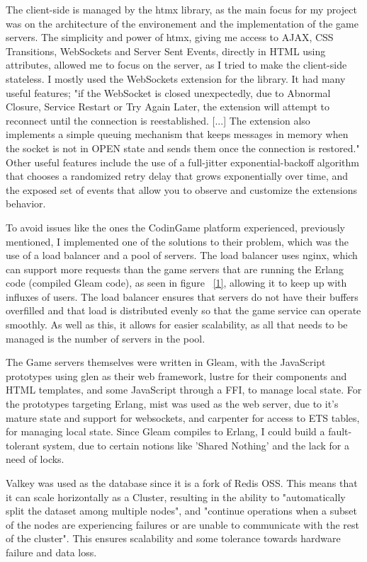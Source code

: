 \documentclass[]{project_interim}
\begin{document}
The client-side is managed by the htmx library, as the main focus for my project
was on the architecture of the environement and the implementation of the game
servers. The simplicity and power of htmx, giving me access to AJAX, CSS Transitions,
WebSockets and Server Sent Events, directly in HTML using attributes,\cite{noauthor_htmx_nodate} allowed me to
focus on the server, as I tried to make the client-side stateless. I mostly
used the WebSockets extension for the library. It had many useful features;
"if the WebSocket is closed unexpectedly, due to Abnormal Closure, Service Restart
or Try Again Later, the extension will attempt to reconnect until the connection
is reestablished. [...] The extension also implements a simple queuing mechanism that
keeps messages in memory when the socket is not in OPEN state and sends
them once the connection is restored."\cite{noauthor_htmx_ws_nodate} Other useful features include the
use of a full-jitter exponential-backoff algorithm that chooses a randomized
retry delay that grows exponentially over time, and the exposed
set of events that allow you to observe and customize the extensions behavior.
\cite{noauthor_htmx_ws_nodate}

To avoid issues like the ones the CodinGame platform
experienced, previously mentioned, I implemented one of the
solutions to their problem, which was the use of a load balancer and a pool
of servers\cite{jobert_story_2017}. The load balancer uses nginx, which can
support more requests
than the game servers that are running the Erlang code (compiled Gleam code),
as seen in figure ~\ref{1}, allowing it to keep up with influxes of users.
The load balancer ensures that servers do not have their buffers overfilled
and that load is distributed evenly so that the game service can operate smoothly.
As well as this, it allows for easier scalability, as all that needs to be managed is the
number of servers in the pool.

The Game servers themselves were written in Gleam, with the JavaScript prototypes
using glen as their web framework, lustre for their components and HTML templates,
and some JavaScript through a FFI, to manage local state. For the prototypes
targeting Erlang, mist was used as the web server, due to it's mature state
and support for websockets, and carpenter for access to ETS tables, for managing
local state. Since Gleam compiles to Erlang, I could build a fault-tolerant
system, due to certain notions like 'Shared Nothing' and the lack for a need
of locks.

Valkey was used as the database since it is a fork of Redis OSS.
This means that it can scale horizontally as a Cluster, resulting in
the ability to "automatically split the dataset among multiple nodes", and
"continue operations when a subset of the nodes are experiencing failures
or are unable to communicate with the rest of the cluster"\cite{noauthor_scale_nodate}.
This ensures scalability and some tolerance towards hardware failure and data loss.
\end{document}

